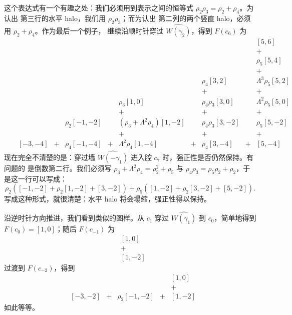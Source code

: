 %
这个表达式有一个有趣之处：我们必须用到表示之间的恒等式 $\rho_2 \rho_3 = \rho_2 + \rho_4$。为认出
第三行的水平 halo，我们用 $\rho_2 \rho_3$；而为认出
第二列的两个竖直 halo，必须用 $\rho_2 + \rho_4$。作为最后一个例子，
继续沿顺时针穿过 $\widehat{W(\gamma_2)}$，得到 $F(c_6)$ 为
%
\begin{equation}
\begin{array}{ccccccccccc}
    &   &   &   &   &   &   &   &   &   &  [5,6] \\
    &   &   &   &   &   &   &   &   &   &  + \\
    &   &   &   &   &   &   &   &   &   &  \rho_5 [5,4] \\
    &   &   &   &   &   &   &   &   &   &  + \\
    &   &   &   &   &   &   &   &  \rho_4[3,2]  &   &  \Lambda^3\rho_5 [5,2] \\
    &   &   &   &   &   &   &   & +  &   &  + \\
    &   &   &   &   &   &\rho_3 [1,0]   &   & \rho_4\rho_3 [3,0]  &   &  \Lambda^2\rho_5 [5,0] \\
    &   &   &   &   &   &+  &   & +  &   &  + \\
    &   &   &   & \rho_2 [-1,-2]  &   &(\rho_3+\Lambda^2\rho_4) [1,-2]   &   & \rho_4\rho_3 [3,-2]  &   & \rho_5 [5,-2] \\
        &   &   &   &   &   &+  &   & +  &   &  + \\
         &   & [-3,-4]  &  + & \rho_4 [-1,-4]  & +  & \Lambda^2\rho_4 [1,-4]   &  + & \rho_4 [3,-4]  & +  &  [5,-4]
\end{array}
\end{equation}
%
现在完全不清楚的是：穿过墙 $\widehat{W(-\gamma_1)}$ 进入腔 $c_7$ 时，强正性是否仍然保持。有问题的
是倒数第二行。我们必须写 $\rho_3 + \Lambda^2\rho_4 = \rho_2^2 + \rho_5$ 与
$\rho_4 \rho_3 = \rho_5 \rho_2 + \rho_2 $，于是这一行可以写成：
%
\begin{equation}
\rho_2 ([-1,-2] + \rho_2 [1,-2] + [3,-2]) + \rho_5 ([1,-2] + \rho_2 [3,-2] + [5,-2]) .
\end{equation}
%
写成这种形式，就很清楚：水平 halo 将会塌缩，强正性得以保持。

沿逆时针方向推进，我们看到类似的图样。从
$c_1$ 穿过 $\widehat{W(\gamma_1)}$ 到 $c_0$，简单地得到 $F(c_0)=[1,0]$；随后 $F(c_{-1})$ 为
%
\begin{equation}
\begin{array}{cc}
& [1,0] \\
& + \\
& [1,-2]
\end{array}
\end{equation}
%
过渡到 $F(c_{-2})$，得到
%
\begin{equation}
\begin{array}{cccccc}
  &  &   &   &   &  [1,0] \\
  &  &   &   &   & + \\
  & [-3,-2] & + & \rho_2 [-1,-2] & + & [1,-2]
\end{array}
\end{equation}
%
如此等等。

